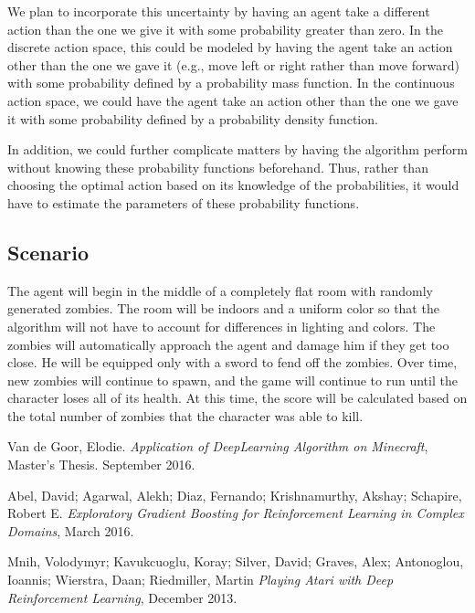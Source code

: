 \documentclass{article}
\begin{document}
We plan to incorporate this uncertainty by having an agent take a different action than the one we give it with some probability greater than zero. In the discrete action space, this could be modeled by having the agent take an action other than the one we gave it (e.g., move left or right rather than move forward) with some probability defined by a probability mass function. In the continuous action space, we could have the agent take an action other than the one we gave it with some probability defined by a probability density function.

In addition, we could further complicate matters by having the algorithm perform without knowing these probability functions beforehand. Thus, rather than choosing the optimal action based on its knowledge of the probabilities, it would have to estimate the parameters of these probability functions.

\subsection{Scenario}

The agent will begin in the middle of a completely flat room with randomly generated zombies.  The room will be indoors and a uniform color so that the algorithm will not have to account for differences in lighting and colors. The zombies will automatically approach the agent and damage him if they get too close. He will be equipped only with a sword to fend off the zombies. Over time, new zombies will continue to spawn, and the game will continue to run until the character loses all of its health. At this time, the score will be calculated  based on the total number of zombies that the character was able to kill.

\pagebreak

\begin{thebibliography}{9}

  Van de Goor, Elodie.
  \emph{Application of DeepLearning Algorithm on Minecraft},
  Master's Thesis. September 2016.

  Abel, David; Agarwal, Alekh; Diaz, Fernando; Krishnamurthy, Akshay; Schapire, Robert E.
  \emph{ Exploratory Gradient Boosting for Reinforcement Learning in Complex Domains},
  March 2016.

  Mnih, Volodymyr; Kavukcuoglu, Koray; Silver, David; Graves, Alex; Antonoglou, Ioannis; Wierstra, Daan;   Riedmiller, Martin
  \emph{Playing Atari with Deep Reinforcement Learning},
  December 2013.

\end{thebibliography}

\end{document}
